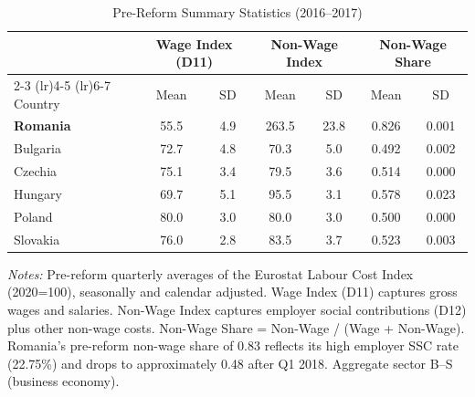 \begin{table}[htbp]
\centering
\begin{threeparttable}
\caption{Pre-Reform Summary Statistics (2016--2017)}
\label{tab:summary}
\begin{tabular}{lcccccc}
\toprule
 & \multicolumn{2}{c}{Wage Index (D11)} & \multicolumn{2}{c}{Non-Wage Index} & \multicolumn{2}{c}{Non-Wage Share} \\
\cmidrule(lr){2-3} \cmidrule(lr){4-5} \cmidrule(lr){6-7}
Country & Mean & SD & Mean & SD & Mean & SD \\
\midrule
\textbf{Romania} & 55.5 & 4.9 & 263.5 & 23.8 & 0.826 & 0.001 \\
Bulgaria & 72.7 & 4.8 & 70.3 & 5.0 & 0.492 & 0.002 \\
Czechia & 75.1 & 3.4 & 79.5 & 3.6 & 0.514 & 0.000 \\
Hungary & 69.7 & 5.1 & 95.5 & 3.1 & 0.578 & 0.023 \\
Poland & 80.0 & 3.0 & 80.0 & 3.0 & 0.500 & 0.000 \\
Slovakia & 76.0 & 2.8 & 83.5 & 3.7 & 0.523 & 0.003 \\
\bottomrule
\end{tabular}
\begin{tablenotes}[flushleft]\footnotesize
\item \textit{Notes:} Pre-reform quarterly averages of the Eurostat Labour Cost Index (2020=100), seasonally and calendar adjusted. Wage Index (D11) captures gross wages and salaries. Non-Wage Index captures employer social contributions (D12) plus other non-wage costs. Non-Wage Share = Non-Wage / (Wage + Non-Wage). Romania's pre-reform non-wage share of 0.83 reflects its high employer SSC rate (22.75\%) and drops to approximately 0.48 after Q1 2018. Aggregate sector B--S (business economy).
\end{tablenotes}
\end{threeparttable}
\end{table}
